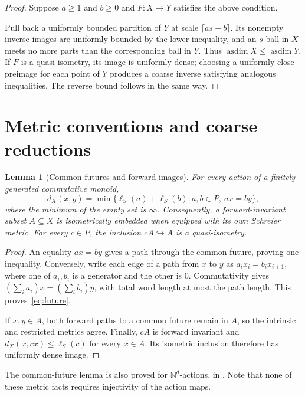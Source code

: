\documentclass[10pt,a4paper]{amsart}
\newtheorem{lemma}[theorem]{Lemma}
\DeclareMathOperator{\asdim}{asdim}
\newcommand{\NN}{\mathbb N}
\begin{document}
\begin{proof}
Suppose $a\ge1$ and $b\ge0$ and $F:X\to Y$ satisfies the above condition.

Pull back a uniformly bounded partition of $Y$ at scale
$\lceil as+b\rceil$. Its nonempty inverse images are uniformly bounded
by the lower inequality, and an $s$-ball in $X$ meets no more parts than
the corresponding ball in $Y$. Thus $\asdim X\le\asdim Y$. If $F$ is a
quasi-isometry, its image is uniformly dense; choosing a uniformly close
preimage for each point of $Y$ produces a coarse inverse satisfying
analogous inequalities. The reverse bound follows in the same way.
\end{proof}

\section{Metric conventions and coarse reductions}\label{sec:metric}

\begin{lemma}[Common futures and forward images]\label{lem:future}
For every action of a finitely generated commutative monoid,
\begin{equation}\label{eq:future}
 d_X(x,y)=\min\{\ell_S(a)+\ell_S(b):a,b\in P,\ ax=by\},
\end{equation}
where the minimum of the empty set is $\infty$. Consequently, a
forward-invariant subset $A\subseteq X$ is isometrically embedded when
equipped with its own Schreier metric. For every $c\in P$, the inclusion
$cA\hookrightarrow A$ is a quasi-isometry.
\end{lemma}

\begin{proof}
An equality $ax=by$ gives a path through the common future, proving one
inequality. Conversely, write each edge of a path from $x$ to $y$ as
$a_i x_i=b_i x_{i+1}$, where one of $a_i,b_i$ is a generator and the other
is $0$. Commutativity gives
$(\sum_i a_i)x=(\sum_i b_i)y$, with total word length at most the path
length. This proves~\eqref{eq:future}.

If $x,y\in A$, both forward paths to a common future remain in $A$, so the
intrinsic and restricted metrics agree. Finally, $cA$ is forward invariant
and $d_X(x,cx)\le\ell_S(c)$ for every $x\in A$. Its isometric inclusion
therefore has uniformly dense image.
\end{proof}

The common-future lemma is also proved for $\NN^d$-actions, in \cite[Lemmas~4.1--4.2]{Wang}. Note that none of these metric facts
requires injectivity of the action maps.
\end{document}
